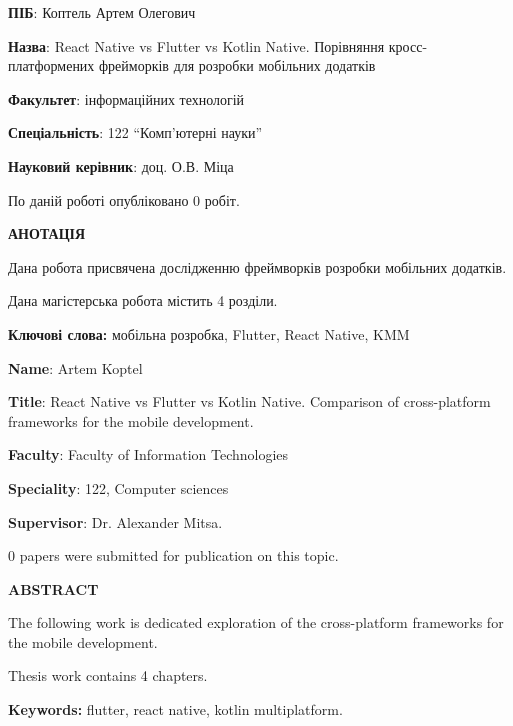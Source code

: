 
\textbf{ПІБ}: Коптель Артем Олегович

\textbf{Назва}: React Native vs Flutter vs Kotlin Native. Порівняння кросс-платформених фрейморків для розробки мобільних додатків

\textbf{Факультет}: інформаційних технологій

\textbf{Спеціальність}: 122 ``Комп'ютерні науки''

\textbf{Науковий керівник}: доц. О.В. Міца

По даній роботі опубліковано $0$ робіт.

\begin{center}
\textbf{АНОТАЦІЯ}
\end{center}

Дана робота присвячена дослідженню фреймворків розробки мобільних додатків.

Дана магістерська робота містить 4 розділи.

{\bf Ключові слова:} мобільна розробка, Flutter, React Native, KMM

\newpage

\textbf{Name}: Artem Koptel

\textbf{Title}: React Native vs Flutter vs Kotlin Native. Comparison of cross-platform frameworks for the mobile development.

\textbf{Faculty}: Faculty of Information Technologies

\textbf{Speciality}: 122, Computer sciences

\textbf{Supervisor}: Dr. Alexander Mitsa. 

$0$ papers were submitted for publication on this topic.

\begin{center}
\textbf{ABSTRACT}
\end{center}

The following work is dedicated exploration of the cross-platform frameworks for the mobile development.

Thesis work contains 4 chapters.

{\bf Keywords:} flutter, react native, kotlin multiplatform.

